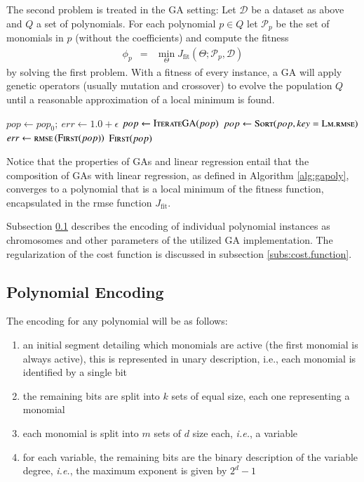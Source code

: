 \documentclass[final,authoryear,3p,times,twocolumn]{elsarticle}
\begin{document}
The second problem is treated in the \ac{GA} setting: Let $\mathcal{D}$ be a dataset as above and $Q$ a set of polynomials. For each polynomial $p\in Q$ let $\mathcal{P}_p$ be the set of monomials in $p$ (without the coefficients) and compute the fitness
%
\begin{eqnarray*}
\phi_p &=& \min_\Theta J_{\textrm{fit}}\left(\Theta;\mathcal{P}_p,\mathcal{D}\right)
\end{eqnarray*}
%
by solving the first problem. With a fitness of every instance, a \ac{GA} will apply genetic operators (usually mutation and crossover) to evolve the population $Q$ until a reasonable approximation of a local minimum is found. 
%
\begin{algorithm}[tb]
\begin{algorithmic}
	\State $pop \gets pop_0;\: err \gets 1.0+\epsilon$
		\State $pop \gets \Call{IterateGA}{pop}$
		\State $pop \gets \Call{Sort}{pop, key = \textsc{Lm.rmse}}$
		\State $err \gets \textsc{rmse}\left(\Call{First}{pop}\right)$
	\EndWhile
	\State\Return $\Call{First}{pop}$
\EndFunction
\end{algorithmic}
\caption{\ac{GAPoly} uses linear regression to find monomial coefficients that minimize the \ac{rmse} over a dataset and \acp{GA} to explore the space of polynomials. At exit the \ac{rmse} of the fittest instance is bounded by $\epsilon$.}\label{alg:gapoly}
\end{algorithm} 
%
Notice that the properties of \acp{GA} and linear regression entail that
the composition of \acp{GA} with linear regression, as defined in Algorithm \ref{alg:gapoly}, converges to a polynomial that is a local minimum of the fitness function, encapsulated in the \ac{rmse} function $J_{\textrm{fit}}$.
%

%
Subsection \ref{subs:polynomial.encoding} describes the encoding of individual polynomial instances as chromosomes and other parameters of the utilized \ac{GA} implementation. The regularization of the cost function is discussed in subsection \ref{subs:cost.function}.

%
\subsection{Polynomial Encoding}\label{subs:polynomial.encoding}
%
The encoding for any polynomial will be as follows:
\begin{enumerate}
\item an initial segment detailing which monomials are active (the first monomial is always active), this is represented in unary description, i.e., each monomial is identified by a single bit
\item the remaining bits are split into $k$ sets of equal size, each one representing a monomial
\item each monomial is split into $m$ sets of $d$ size each, \emph{i.e.}, a variable
\item for each variable, the remaining bits are the binary description of the variable degree, \emph{i.e.}, the maximum exponent is given by $2^d-1$
\end{enumerate}
\end{document}
